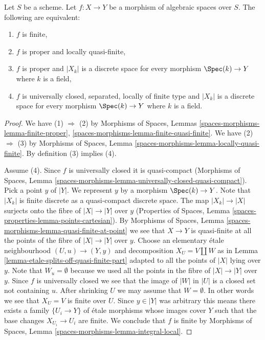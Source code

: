 \begin{lemma}
\label{lemma-characterize-finite}
Let $S$ be a scheme. Let $f : X \to Y$ be a morphism of algebraic spaces
over $S$. The following are equivalent:
\begin{enumerate}
\item $f$ is finite,
\item $f$ is proper and locally quasi-finite,
\item $f$ is proper and $|X_k|$ is a discrete space for every morphism
$\Spec(k) \to Y$ where $k$ is a field,
\item $f$ is universally closed, separated, locally of finite type
and $|X_k|$ is a discrete space for every morphism $\Spec(k) \to Y$
where $k$ is a field.
\end{enumerate}
\end{lemma}

\begin{proof}
We have (1) $\Rightarrow$ (2) by
Morphisms of Spaces, Lemmas \ref{spaces-morphisms-lemma-finite-proper},
\ref{spaces-morphisms-lemma-finite-quasi-finite}.
We have (2) $\Rightarrow$ (3) by
Morphisms of Spaces, Lemma
\ref{spaces-morphisms-lemma-locally-quasi-finite}.
By definition (3) implies (4).

\medskip\noindent
Assume (4). Since $f$ is universally closed it is quasi-compact
(Morphisms of Spaces, Lemma
\ref{spaces-morphisms-lemma-universally-closed-quasi-compact}).
Pick a point $y$ of $|Y|$. We represent $y$ by a
morphism $\Spec(k) \to Y$. Note that $|X_k|$ is finite discrete
as a quasi-compact discrete space. The map $|X_k| \to |X|$ surjects
onto the fibre of $|X| \to |Y|$ over $y$
(Properties of Spaces, Lemma \ref{spaces-properties-lemma-points-cartesian}).
By
Morphisms of Spaces, Lemma \ref{spaces-morphisms-lemma-quasi-finite-at-point}
we see that $X \to Y$ is quasi-finite at all the points of the fibre
of $|X| \to |Y|$ over $y$.
Choose an elementary \'etale neighbourhood $(U, u) \to (Y, y)$
and decomposition $X_U = V \amalg W$ as in
Lemma \ref{lemma-etale-splits-off-quasi-finite-part}
adapted to all the points of $|X|$ lying over $y$.
Note that $W_u = \emptyset$ because we used all the points
in the fibre of $|X| \to |Y|$ over $y$.
Since $f$ is universally closed we see that
the image of $|W|$ in $|U|$ is a closed set not containing $u$.
After shrinking $U$ we may assume that $W = \emptyset$.
In other words we see that $X_U = V$ is finite over $U$.
Since $y \in |Y|$ was arbitrary
this means there exists a family $\{U_i \to Y\}$
of \'etale morphisms whose images cover $Y$ such that
the base changes $X_{U_i} \to U_i$ are finite.
We conclude that $f$ is finite by
Morphisms of Spaces, Lemma \ref{spaces-morphisms-lemma-integral-local}.
\end{proof}


